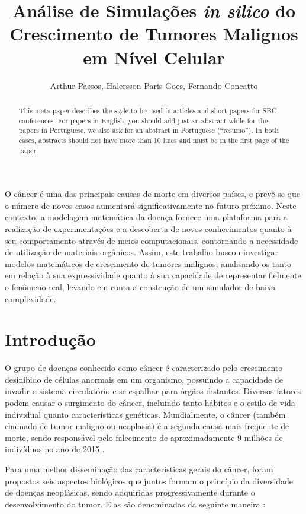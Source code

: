 \documentclass[12pt]{article}
\title{Análise de Simulações \textit{in silico} do Crescimento de Tumores Malignos em Nível Celular}
\author{Arthur Passos\inst{1}, Halersson Paris Goes\inst{1}, Fernando Concatto\inst{1}}
\begin{document}
\maketitle

\begin{abstract}
  This meta-paper describes the style to be used in articles and short papers
  for SBC conferences. For papers in English, you should add just an abstract
  while for the papers in Portuguese, we also ask for an abstract in
  Portuguese (``resumo''). In both cases, abstracts should not have more than
  10 lines and must be in the first page of the paper.
\end{abstract}

\begin{resumo}
  O câncer é uma das principais causas de morte em diversos países, e prevê-se que o número de novos casos aumentará significativamente no futuro próximo. Neste contexto, a modelagem matemática da doença fornece uma plataforma para a realização de experimentações e a descoberta de novos conhecimentos quanto à seu comportamento através de meios computacionais, contornando a necessidade de utilização de materiais orgânicos. Assim, este trabalho buscou investigar modelos matemáticos de crescimento de tumores malignos, analisando-os tanto em relação à sua expressividade quanto à sua capacidade de representar fielmente o fenômeno real, levando em conta a construção de um simulador de baixa complexidade. %
\end{resumo}

\section{Introdução}

O grupo de doenças conhecido como câncer é caracterizado pelo crescimento desinibido de células anormais em um organismo, possuindo a capacidade de invadir o sistema circulatório e se espalhar para órgãos distantes. Diversos fatores podem causar o surgimento do câncer, incluindo tanto hábitos e o estilo de vida individual quanto características genéticas. Mundialmente, o câncer (também chamado de tumor maligno ou neoplasia) é a segunda causa mais frequente de morte, sendo responsável pelo falecimento de aproximadamente 9 milhões de indivíduos no ano de 2015 \cite{WHO2017,ACS2017}.

Para uma melhor disseminação das características gerais do câncer, foram propostos seis aspectos biológicos que juntos formam o princípio da diversidade de doenças neoplásicas, sendo adquiridas progressivamente durante o desenvolvimento do tumor. Elas são denominadas da seguinte maneira \cite{Hanahan2011}:
\end{document}

